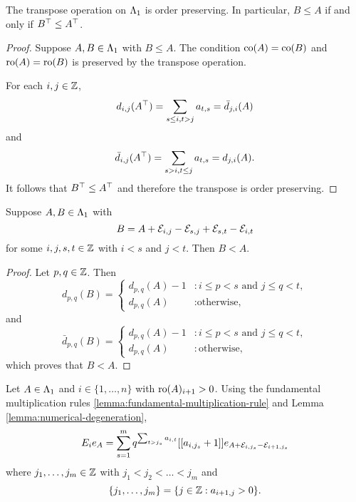 \documentclass[a4paper, 11pt]{report}
\begin{document}
\begin{lemma}\label{lemma:transpose-preserves-order}
The transpose operation on $\Lambda_1{}$ is order preserving. In particular, $B\le A$ if and only if $B^\top\le A^\top$.
\end{lemma}

\begin{proof}
Suppose $A,B\in\Lambda_1{}$ with $B\le A$. The condition $\operatorname{co}(A)=\operatorname{co}(B)$ and $\operatorname{ro}(A)=\operatorname{ro}(B)$ is preserved by the transpose operation.

For each $i,j\in\mathbb{Z}$,
\begin{equation*}
d_{i,j}{(A^\top)} = \sum_{s\le i,t>j} a_{t,s} = \bar{d}_{j,i}{(A)}
\end{equation*}
and
\begin{equation*}
\bar{d}_{i,j}{(A^\top)} = \sum_{s>i,t\le j} a_{t,s} = d_{j,i}{(A)}.
\end{equation*}
It follows that $B^\top\le A^\top$ and therefore the transpose is order preserving.
\end{proof}

\begin{lemma}\label{lemma:numerical-degeneration}
Suppose $A,B\in\Lambda_1{}$ with
\begin{equation*}
B = A +\mathcal{E}_{i,j} -\mathcal{E}_{s,j} +\mathcal{E}_{s,t} -\mathcal{E}_{i,t}
\end{equation*}
for some $i,j,s,t\in\mathbb{Z}$ with $i<s$ and $j<t$. Then $B<A$.
\end{lemma}

\begin{proof}
Let $p,q\in\mathbb{Z}$. Then
\begin{equation*}
d_{p,q}{(B)} =\begin{cases}
d_{p,q}{(A)} -1 &: i\le p<s \text{ and } j\le q<t,\\
d_{p,q}{(A)} &: \text{otherwise,}
\end{cases}
\end{equation*}
and
\begin{equation*}
\bar{d}_{p,q}{(B)} =\begin{cases}
d_{p,q}{(A)} -1 &: i\le p<s \text{ and } j\le q<t,\\
d_{p,q}{(A)} &: \text{otherwise},
\end{cases}
\end{equation*}
which proves that $B<A$.
\end{proof}

Let $A\in\Lambda_1{}$ and $i\in\{1,\ldots,n\}$ with $\operatorname{ro}(A)_{i+1}>0$. Using the fundamental multiplication rules \ref{lemma:fundamental-multiplication-rule} and Lemma \ref{lemma:numerical-degeneration},
\begin{equation*}
E_ie_A = \sum_{s=1}^{m} q^{\sum_{t>j_s}a_{i,t}}[[a_{i,j_s}+1]] e_{A+\mathcal{E}_{i,j_s}-\mathcal{E}_{i+1,j_s}}
\end{equation*}
where $j_1,\ldots,j_m\in\mathbb{Z}$ with $j_1<j_2<\ldots<j_m$ and
\begin{equation*}
\{j_1,\ldots,j_m\}=\{j\in\mathbb{Z}: a_{i+1,j}>0\}.
\end{equation*}
\end{document}
